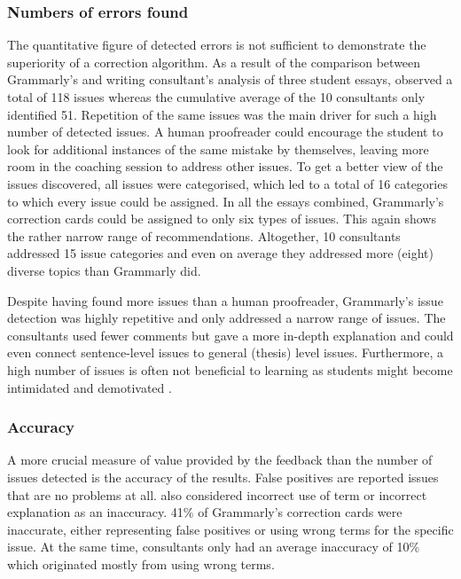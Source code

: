 \documentclass[runningheads]{llncs}
\let\OldTextregistered\textregistered
\renewcommand{\textregistered}{\OldTextregistered\xspace}
\begin{document}
\subsubsection{Numbers of errors found}
The quantitative figure of detected errors is not sufficient to demonstrate the superiority of a correction algorithm. As a result of the comparison between Grammarly\textregistered's and writing consultant's analysis of three student essays, \textcite{dembsey_closing_2017} observed a total of 118 issues whereas the cumulative average of the 10 consultants only identified 51. Repetition of the same issues was the main driver for such a high number of detected issues. A human proofreader could encourage the student to look for additional instances of the same mistake by themselves, leaving more room in the coaching session to address other issues. To get a better view of the issues discovered, all issues were categorised, which led to a total of 16 categories to which every issue could be assigned. In all the essays combined, Grammarly\textregistered's correction cards could be assigned to only six types of issues. This again shows the rather narrow range of recommendations. Altogether, 10 consultants addressed 15 issue categories and even on average they addressed more (eight) diverse topics than Grammarly\textregistered did.

Despite having found more issues than a human proofreader, Grammarly\textregistered's issue detection was highly repetitive and only addressed a narrow range of issues. The consultants used fewer comments but gave a more in-depth explanation and could even connect sentence-level issues to general (thesis) level issues. Furthermore, a high number of issues is often not beneficial to learning as students might become intimidated and demotivated \citep{dembsey_closing_2017}.


\subsubsection{Accuracy}
A more crucial measure of value provided by the feedback than the number of issues detected is the accuracy of the results. False positives are reported issues that are no problems at all. \textcite{dembsey_closing_2017} also considered incorrect use of term or incorrect explanation as an inaccuracy. 41\% of Grammarly\textregistered's correction cards were inaccurate, either representing false positives or using wrong terms for the specific issue. At the same time, consultants only had an average inaccuracy of 10\% which originated mostly from using wrong terms.
\citep{dembsey_closing_2017}
\end{document}
